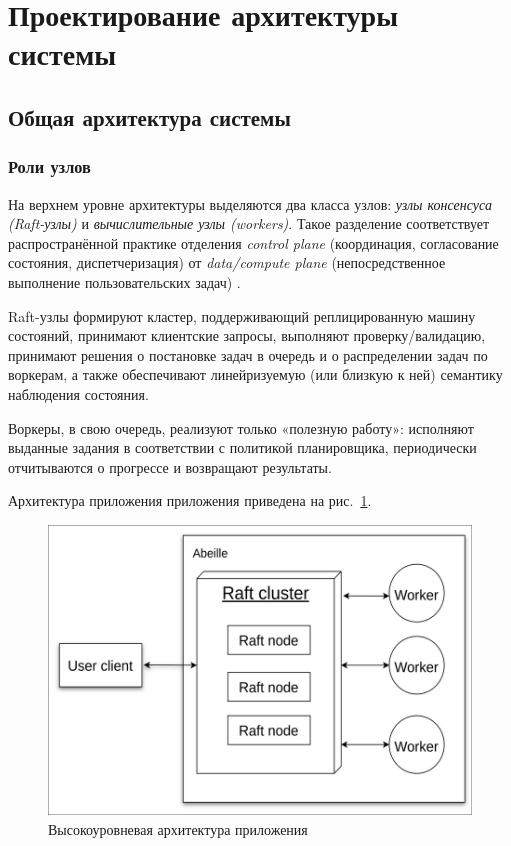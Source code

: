 \section{Проектирование архитектуры системы}

\subsection{Общая архитектура системы}

\subsubsection{Роли узлов}

На верхнем уровне архитектуры выделяются два класса узлов: \emph{узлы
консенсуса (Raft-узлы)} и \emph{вычислительные узлы (workers)}. Такое
разделение соответствует распространённой практике отделения \emph{control
plane} (координация, согласование состояния, диспетчеризация) от
\emph{data/compute plane} (непосредственное выполнение пользовательских задач)
\cite{coulouris2012}.

Raft-узлы формируют кластер, поддерживающий реплицированную машину состояний,
принимают клиентские запросы, выполняют проверку/валидацию, принимают решения о
постановке задач в очередь и о распределении задач по воркерам, а также
обеспечивают линейризуемую (или близкую к ней) семантику наблюдения состояния.

Воркеры, в свою очередь, реализуют только «полезную работу»: исполняют выданные
задания в соответствии с политикой планировщика, периодически отчитываются о
прогрессе и возвращают результаты.

Архитектура приложения приложения приведена на рис.~\ref{fig:arch-overview}.

\begin{figure}
  \centering
  \includegraphics[scale=0.4]{inc/arch-overview.png}
  \caption{Высокоуровневая архитектура приложения}
  \label{fig:arch-overview}
\end{figure}

